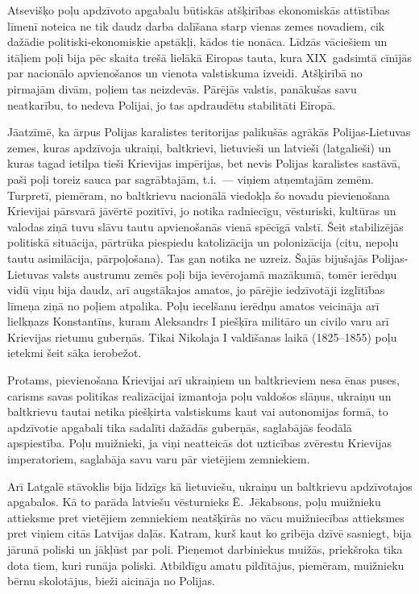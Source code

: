 \documentclass[twoside,a5paper,12pt,fleqn,openany]{extbook}
\begin{document}
Atsevišķo poļu apdzīvoto apgabalu būtiskās atšķirības ekonomiskās attīstības līmenī noteica ne tik daudz darba dalīšana starp vienas zemes novadiem, cik dažādie politiski-ekonomiskie apstākļi, kādos tie nonāca. Līdzās vāciešiem un itāļiem poļi bija pēc skaita trešā lielākā Eiropas tauta, kura XIX~gadsimtā cīnījās par nacionālo apvienošanos un vienota valstiskuma izveidi. Atšķirībā no pirmajām divām, poļiem tas neizdevās. Pārējās valstis, panākušas savu neatkarību, to nedeva Polijai, jo tas apdraudētu stabilitāti Eiropā.

Jāatzīmē, ka ārpus Polijas karalistes teritorijas palikušās agrākās Polijas-Lietuvas zemes, kuras apdzīvoja ukraiņi, baltkrievi, lietuvieši un latvieši (latgalieši) un kuras tagad ietilpa tieši Krievijas impērijas, bet nevis Polijas karalistes sastāvā, paši poļi toreiz sauca par sagrābtajām, t.i.~--- viņiem atņemtajām zemēm. Turpretī, piemēram, no baltkrievu nacionālā viedokļa šo novadu pievienošana Krievijai pārsvarā jāvērtē pozitīvi, jo notika radniecīgu, vēsturiski, kultūras un valodas ziņā tuvu slāvu tautu apvienošanās vienā spēcīgā valstī. Šeit stabilizējās politiskā situācija, pārtrūka piespiedu katolizācija un polonizācija (citu, nepoļu tautu asimilācija, pārpoļošana). Tas gan notika ne uzreiz. Šajās bijušajās Polijas-Lietuvas valsts austrumu zemēs poļi bija ievērojamā mazākumā, tomēr ierēdņu vidū viņu bija daudz, arī augstākajos amatos, jo pārējie iedzīvotāji izglītības līmeņa ziņā no poļiem atpalika. Poļu iecelšanu ierēdņu amatos veicināja arī lielkņazs Konstantīns, kuram Aleksandrs I piešķīra militāro un civilo varu arī Krievijas rietumu guberņās. Tikai Nikolaja I valdīšanas laikā (1825--1855) poļu ietekmi šeit sāka ierobežot.

Protams, pievienošana Krievijai arī ukraiņiem un baltkrieviem nesa ēnas puses, carisms savas politikas realizācijai izmantoja poļu valdošos slāņus, ukraiņu un baltkrievu tautai netika piešķirta valstiskums kaut vai autonomijas formā, to apdzīvotie apgabali tika sadalīti dažādās guberņās, saglabājās feodālā apspiestība. Poļu muižnieki, ja viņi neatteicās dot uzticības zvērestu Krievijas imperatoriem, saglabāja savu varu pār vietējiem zemniekiem.

Arī Latgalē stāvoklis bija līdzīgs kā lietuviešu, ukraiņu un baltkrievu apdzīvotajos apgabalos. Kā to parāda latviešu vēsturnieks Ē.~Jēkabsons, poļu muižnieku attieksme pret vietējiem zemniekiem neatšķīrās no vācu muižniecības attieksmes pret viņiem citās Latvijas daļās. Katram, kurš kaut ko gribēja dzīvē sasniegt, bija jārunā poliski un jākļūst par poli. Pieņemot darbiniekus muižās, priekšroka tika dota tiem, kuri runāja poliski. Atbildīgu amatu pildītājus, piemēram, muižnieku bērnu skolotājus, bieži aicināja no Polijas.
\end{document}
